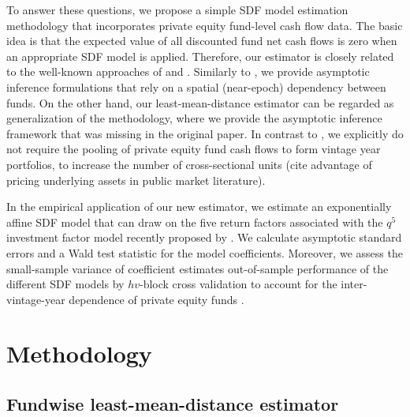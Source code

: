 \documentclass[12pt]{article}
\begin{document}
To answer these questions, we propose a simple SDF model estimation methodology that incorporates private equity fund-level cash flow data.
The basic idea is that the expected value of all discounted fund net cash flows is zero when an appropriate SDF model is applied.
Therefore, our estimator is closely related to the well-known approaches of \cite{DLP12} and \cite{KN16}.
Similarly to \cite{KN16}, we provide asymptotic inference formulations that rely on a spatial (near-epoch) dependency between funds.
On the other hand, our least-mean-distance estimator can be regarded as generalization of the \cite{DLP12} methodology, where we provide the asymptotic inference framework that was missing in the original paper.
In contrast to \cite{DLP12}, we explicitly do not require the pooling of private equity fund cash flows to form vintage year portfolios, to increase the number of cross-sectional units (cite advantage of pricing underlying assets in public market literature).

In the empirical application of our new estimator, we estimate an exponentially affine SDF model that can draw on the five return factors associated with the $q^5$ investment factor model recently proposed by \cite{HXZ20}.
We calculate asymptotic standard errors and a Wald test statistic for the model coefficients.
Moreover, we assess the small-sample variance of coefficient estimates out-of-sample performance of the different SDF models by $hv$-block cross validation to account for the inter-vintage-year dependence of private equity funds \citep{R00}.



\section{Methodology}

\subsection{Fundwise least-mean-distance estimator}
\end{document}
